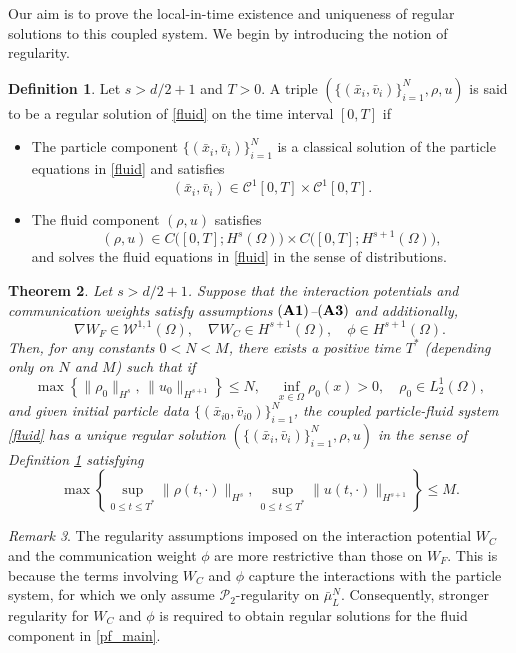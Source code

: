 \documentclass[10pt, reqno]{amsart}
\newtheorem{theorem}{Theorem}[section]
\theoremstyle{definition}
\newtheorem{definition}[theorem]{Definition}
\theoremstyle{remark}
\newtheorem{remark}[theorem]{Remark}
\numberwithin{equation}{section}
\newcommand{\calC}{\mathcal C}
\newcommand{\calW}{\mathcal W}
\begin{document}
Our aim is to prove the local-in-time existence and uniqueness of regular solutions to this coupled system. We begin by introducing the notion of regularity.
\begin{definition}\label{def_strong}
Let $s > d/2+1$ and $T>0$. A triple $( \{(\bar{x}_i,\bar{v}_i) \}_{i=1}^N, \rho, u)$ is said to be a regular solution of \eqref{fluid} on the time interval $[0,T]$ if
\begin{itemize}
    \item[(i)] The particle component $\{ (\bar{x}_i,\bar{v}_i) \}_{i=1}^N$ is a classical solution of the particle equations in \eqref{fluid} and satisfies
    \[
    (\bar{x}_i,\bar{v}_i) \in \calC^1[0,T] \times \calC^1[0,T].
    \]
    \item[(ii)] The fluid component $(\rho, u)$ satisfies
    \[
    (\rho, u) \in C\bigl([0,T]; H^s(\Omega)\bigr) \times C\bigl([0,T]; H^{s+1}(\Omega)\bigr),
    \]
    and solves the fluid equations in \eqref{fluid} in the sense of distributions.
\end{itemize}
\end{definition}

\begin{theorem}\label{thm_ex2}
Let $s > d/2+1$. Suppose that the interaction potentials and communication weights satisfy assumptions ${\bf (A1)}$--${\bf (A3)}$ and additionally, 
\[
\nabla W_F \in \calW^{1,1}(\Omega), \quad \nabla W_C \in H^{s+1}(\Omega), \quad \phi \in H^{s+1}(\Omega).
\]
Then, for any constants $0 < N < M$, there exists a positive time $T^*$ (depending only on $N$ and $M$) such that if
\[
\max\left\{\|\rho_0\|_{H^s}, \, \|u_0\|_{H^{s+1}}\right\}\leq N, \quad \inf_{x \in \Omega}\rho_0(x) >0, \quad \rho_0 \in L^1_2(\Omega),
\]
and given initial particle data $\{ (\bar{x}_{i0},\bar{v}_{i0})\}_{i=1}^N$, the coupled particle-fluid system \eqref{fluid} has a unique regular solution $(\{ (\bar{x}_i,\bar{v}_i) \}_{i=1}^N, \rho, u)$ in the sense of Definition \ref{def_strong} satisfying
\[
\max\left\{ \sup_{0\le t\le T^*}\|\rho(t,\cdot)\|_{H^s}, \, \sup_{0\le t\le T^*}\|u(t,\cdot)\|_{H^{s+1}} \right\}\le M.
\]
\end{theorem}

\begin{remark}
The regularity assumptions imposed on the interaction potential $W_C$ and the communication weight $\phi$ are more restrictive than those on $W_F$. This is because the terms involving $W_C$ and $\phi$ capture the interactions with the particle system, for which we only assume $\mathcal{P}_2$-regularity on $\bar\mu_L^N$. Consequently, stronger regularity for $W_C$ and $\phi$ is required to obtain regular solutions for the fluid component in \eqref{pf_main}.
\end{remark}
\end{document}
